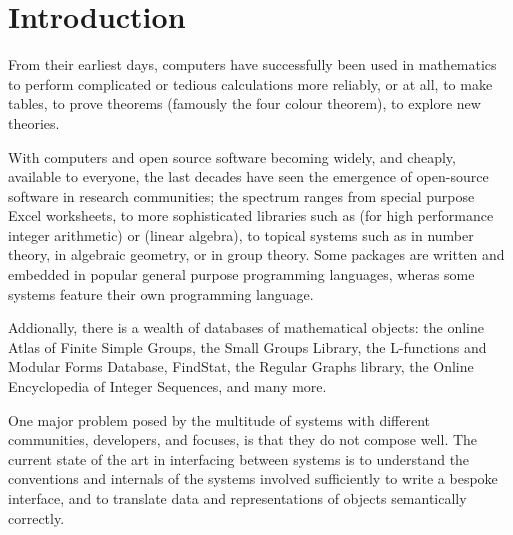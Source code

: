 

\section{Introduction}

From their earliest days, computers have successfully been used in mathematics
to perform complicated or tedious calculations more reliably, or at all, to make
tables, to prove theorems (famously the four colour theorem), to explore new
theories.

With computers and open source software becoming widely, and cheaply, available
to everyone, the last decades have seen the emergence of open-source software in
research communities; the spectrum ranges from special purpose Excel worksheets,
to more sophisticated libraries such as \MPIR (for high performance integer
arithmetic) or \Linbox (linear algebra), to topical systems
such as \Pari in number theory, \Singular in algebraic geometry, or \GAP in group
theory.
Some packages are written and embedded in popular general purpose programming
languages, wheras some systems feature their own programming language.

Addionally, there is a wealth of databases of mathematical objects: the online
Atlas of Finite Simple Groups, the Small Groups Library, the L-functions and
Modular Forms Database, FindStat, the Regular Graphs library, the Online
Encyclopedia of Integer Sequences, and many more.

One major problem posed by the multitude of systems with different communities,
developers, and focuses, is that they do not compose well. The current state of
the art in interfacing between systems is to understand the conventions and
internals of the systems involved sufficiently to write a bespoke interface, and
to translate data and representations of objects semantically correctly.

